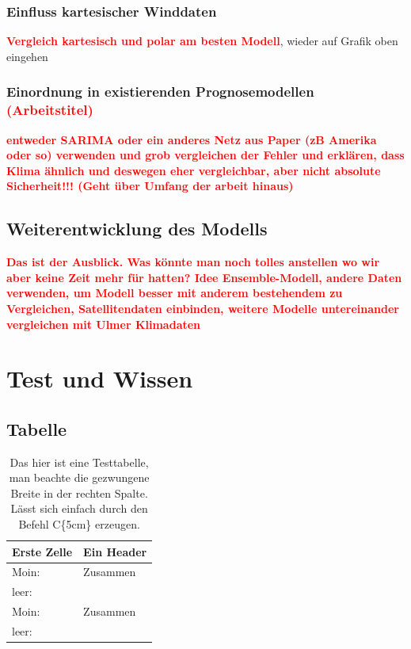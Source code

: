 \documentclass[
12pt, %
toc=listofnumbered, %
toc=chapterentrydotfill, %
numbers=noenddot, %
captions=tableheading, %
bibliography=numbered
]{scrreprt}
\let\Oldsection\section
\renewcommand{\section}{\FloatBarrier\Oldsection}
\let\Oldsubsection\subsection
\renewcommand{\subsection}{\FloatBarrier\Oldsubsection}
\newcommand{\highlight}[1]{\textbf{\textcolor{red}{#1}}}
\begin{document}
\subsection{Einfluss kartesischer Winddaten}
\highlight{Vergleich kartesisch und polar am besten Modell}, wieder auf Grafik oben eingehen

\subsection{Einordnung in existierenden Prognosemodellen \highlight{(Arbeitstitel)}}
\highlight{entweder SARIMA oder ein anderes Netz aus Paper (zB Amerika oder so) verwenden und grob vergleichen der Fehler und erklären, dass
 Klima ähnlich und deswegen eher vergleichbar, aber nicht absolute Sicherheit!!! (Geht über Umfang der arbeit hinaus)}

\section{Weiterentwicklung des Modells}
\highlight{Das ist der Ausblick. Was könnte man noch tolles anstellen wo wir aber keine Zeit mehr für hatten? Idee Ensemble-Modell, andere Daten 
verwenden, um Modell besser mit anderem bestehendem zu Vergleichen, Satellitendaten einbinden, weitere Modelle untereinander vergleichen mit Ulmer Klimadaten}

\chapter{Test und Wissen}

\section{Tabelle}
\begin{table}[ht]
	\centering
	\caption{Das hier ist eine Testtabelle, man beachte die gezwungene Breite in der rechten Spalte. Lässt sich einfach durch den Befehl C\{5cm\} erzeugen.}
	\begin{tabular}{|l|C{5cm}|}
		\hline
		\textbf{Erste Zelle}&\textbf{Ein Header}\\
		\hline
		Moin: & Zusammen\\\hline
		leer:&\\\hline
		Moin: & Zusammen\\\hline
		leer:&\\\hline
	\end{tabular}
\label{tab:testtabelle}
\end{table}
\end{document}
